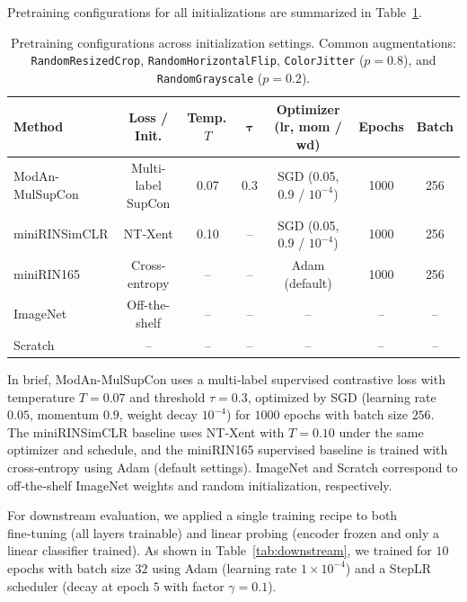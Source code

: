 \documentclass[final,1p,times]{elsarticle}
\begin{document}
Pretraining configurations for all initializations are summarized in Table~\ref{tab:pretrain}.
\begin{table}[t]
  \centering
  \caption{Pretraining configurations across initialization settings. Common augmentations: \texttt{RandomResizedCrop}, \texttt{RandomHorizontalFlip}, \texttt{ColorJitter} ($p{=}0.8$), and \texttt{RandomGrayscale} ($p{=}0.2$).}
  \label{tab:pretrain}
  \small
  \begin{tabular}{lcccccc}
    \toprule
    \textbf{Method} & \textbf{Loss / Init.} & \textbf{Temp.\,$T$} & $\boldsymbol{\tau}$ &
    \textbf{Optimizer (lr, mom / wd)} & \textbf{Epochs} & \textbf{Batch} \\
    \midrule
    ModAn-MulSupCon  & Multi-label SupCon & 0.07 & 0.3 & SGD (0.05, 0.9 / $10^{-4}$) & 1000 & 256 \\
    miniRINSimCLR    & NT-Xent            & 0.10 & –   & SGD (0.05, 0.9 / $10^{-4}$) & 1000 & 256 \\
    miniRIN165       & Cross-entropy      & –    & –   & Adam (default)               & 1000 & 256 \\
    ImageNet         & Off-the-shelf      & –    & –   & –                             & –    & –   \\
    Scratch          & –                  & –    & –   & –                             & –    & –   \\
    \bottomrule
  \end{tabular}
\end{table}
In brief, ModAn-MulSupCon uses a multi‑label supervised contrastive loss with temperature $T{=}0.07$ and threshold $\tau{=}0.3$, optimized by SGD (learning rate $0.05$, momentum $0.9$, weight decay $10^{-4}$) for $1000$ epochs with batch size $256$. The miniRINSimCLR baseline uses NT‑Xent with $T{=}0.10$ under the same optimizer and schedule, and the miniRIN165 supervised baseline is trained with cross‑entropy using Adam (default settings). ImageNet and Scratch correspond to off‑the‑shelf ImageNet weights and random initialization, respectively.



For downstream evaluation, we applied a single training recipe to both fine‑tuning (all layers trainable) and linear probing (encoder frozen and only a linear classifier trained). As shown in Table~\ref{tab:downstream}, we trained for $10$ epochs with batch size $32$ using Adam (learning rate $1{\times}10^{-4}$) and a StepLR scheduler (decay at epoch $5$ with factor $\gamma{=}0.1$).
\end{document}

